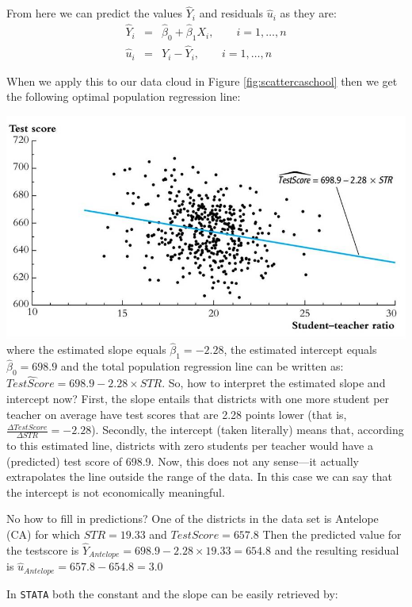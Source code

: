 \documentclass[
]{book}
\begin{document}
From here we can predict the values \(\hat{Y}_i\) and residuals \(\hat{u}_i\) as they are:
\begin{eqnarray}
    \hat{Y}_i &=& \hat{\beta}_0 + \hat{\beta}_1 X_i, \qquad i = 1, \ldots, n\\
    \hat{u}_i &=& Y_i - \hat{Y}_i, \qquad i = 1, \ldots, n
\end{eqnarray}

When we apply this to our data cloud in Figure \ref{fig:scattercaschool} then we get the following optimal population regression line:

\includegraphics{./figures/Lecture1_sheet13.jpg}
where the estimated slope equals \(\hat{\beta}_1 = -2.28\), the estimated intercept equals \(\hat{\beta}_0 = 698.9\) and the total population regression line can be written as: \(\widehat{TestScore} = 698.9 - 2.28 \times STR\). So, how to interpret the estimated slope and intercept now? First, the slope entails that districts with one more student per teacher on average have test scores that are 2.28 points lower (that is, \(\frac{\Delta TestScore}{\Delta STR} =-2.28\)). Secondly, the intercept (taken literally) means that, according to this estimated line, districts with zero students per teacher would have a (predicted) test score of 698.9. Now, this does not any sense---it actually extrapolates the line outside the range of the data. In this case we can say that the intercept is not economically meaningful.

No how to fill in predictions? One of the districts in the data set is Antelope (CA) for which \(STR = 19.33\) and \(TestScore = 657.8\) Then the predicted value for the testscore is \(\hat{Y}_{Antelope}= 698.9 - 2.28 \times 19.33 = 654.8\) and the resulting residual is \(\hat{u}_{Antelope} = 657.8 - 654.8 = 3.0\)

In \texttt{STATA} both the constant and the slope can be easily retrieved by:
\end{document}

